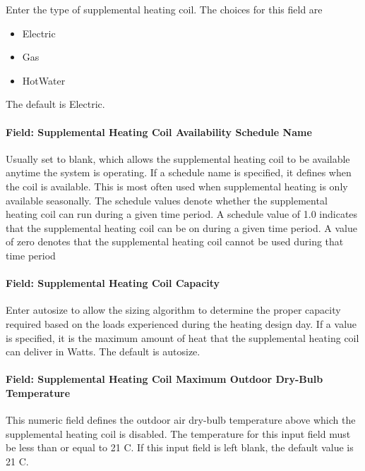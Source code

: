 Enter the type of supplemental heating coil. The choices for this field are

\begin{itemize}
\item
  Electric
\item
  Gas
\item
  HotWater
\end{itemize}

The default is Electric.

\paragraph{Field: Supplemental Heating Coil Availability Schedule Name}\label{field-supplemental-heating-coil-availability-schedule-name}

Usually set to blank, which allows the supplemental heating coil to be available anytime the system is operating. If a schedule name is specified, it defines when the coil is available. This is most often used when supplemental heating is only available seasonally. The schedule values denote whether the supplemental heating coil can run during a given time period. A schedule value of 1.0 indicates that the supplemental heating coil can be on during a given time period. A value of zero denotes that the supplemental heating coil cannot be used during that time period

\paragraph{Field: Supplemental Heating Coil Capacity}\label{field-supplemental-heating-coil-capacity}

Enter autosize to allow the sizing algorithm to determine the proper capacity required based on the loads experienced during the heating design day. If a value is specified, it is the maximum amount of heat that the supplemental heating coil can deliver in Watts. The default is autosize.

\paragraph{Field: Supplemental Heating Coil Maximum Outdoor Dry-Bulb Temperature}\label{field-supplemental-heating-coil-maximum-outdoor-dry-bulb-temperature}

This numeric field defines the outdoor air dry-bulb temperature above which the supplemental heating coil is disabled. The temperature for this input field must be less than or equal to 21 C. If this input field is left blank, the default value is 21 C.

